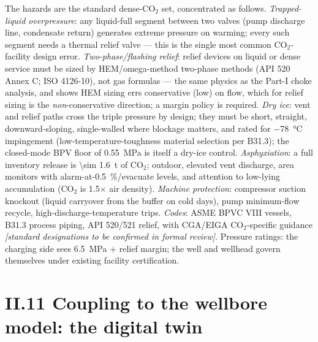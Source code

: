 The hazards are the standard dense-CO$_2$ set, concentrated as
follows. \emph{Trapped-liquid overpressure}: any liquid-full segment
between two valves (pump discharge line, condensate return) generates
extreme pressure on warming; every such segment needs a thermal
relief valve --- this is the single most common CO$_2$-facility
design error. \emph{Two-phase/flashing relief}: relief devices on
liquid or dense service must be sized by HEM/omega-method two-phase
methods (API 520 Annex C; ISO 4126-10), not gas formulas --- the same
physics as the Part-I choke analysis, and \citet{hammer2022} shows
HEM sizing errs conservative (low) on flow, which for relief sizing
is the \emph{non}-conservative direction; a margin policy is
required. \emph{Dry ice}: vent and relief paths cross the triple
pressure by design; they must be short, straight, downward-sloping,
single-walled where blockage matters, and rated for
\SI{-78}{\celsius} impingement (low-temperature-toughness material
selection per B31.3); the closed-mode BPV floor of \SI{0.55}{MPa} is
itself a dry-ice control. \emph{Asphyxiation}: a full inventory
release is \SI{\sim 1.6}{t} of CO$_2$; outdoor, elevated vent
discharge, area monitors with alarm-at-\SI{0.5}{\%}/evacuate
levels, and attention to low-lying accumulation (CO$_2$ is
1.5$\times$ air density). \emph{Machine protection}: compressor
suction knockout (liquid carryover from the buffer on cold days),
pump minimum-flow recycle, high-discharge-temperature trips.
\emph{Codes}: ASME BPVC VIII vessels, B31.3 process piping, API
520/521 relief, with CGA/EIGA CO$_2$-specific guidance
\emph{[standard designations to be confirmed in formal review]}.
Pressure ratings: the charging side sees \SI{6.5}{MPa} + relief
margin; the well and wellhead govern themselves under existing
facility certification.

\section{II.11 Coupling to the wellbore model: the digital twin}

